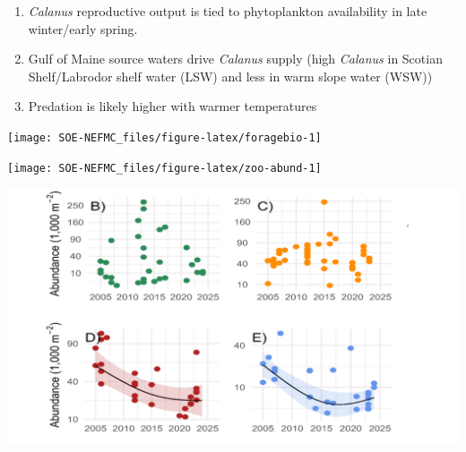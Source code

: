 \documentclass[
  10pt,
]{article}
\providecommand{\tightlist}{%
  \setlength{\itemsep}{0pt}\setlength{\parskip}{0pt}}
\let\origfigure\figure
\let\endorigfigure\endfigure
\renewenvironment{figure}[1][2] {
    \expandafter\origfigure\expandafter[H]
} {
    \endorigfigure
}
\begin{document}
\begin{enumerate}
\def\labelenumi{\arabic{enumi}.}
\tightlist
\item
  \emph{Calanus} reproductive output is tied to phytoplankton availability in late winter/early spring.
\item
  Gulf of Maine source waters drive \emph{Calanus} supply (high \emph{Calanus} in Scotian Shelf/Labrodor shelf water (LSW) and less in warm slope water (WSW))
\item
  Predation is likely higher with warmer temperatures
\end{enumerate}

\begin{figure}

{\centering \texttt{[image: SOE-NEFMC\_files/figure-latex/foragebio-1]} 

}

\caption{Forage fish index in GB (left) and GOM (right) for spring (blue) and fall (red) surveys. Index values are relative to the maximum observation within a region across surveys.}\label{fig:foragebio}
\end{figure}
\begin{figure}

{\centering \texttt{[image: SOE-NEFMC\_files/figure-latex/zoo-abund-1]} 

}

\caption{Georges Bank (GB) and Gulf of Maine (GOM) abundance anomalies three dominant zooplankton (\textit{Calanus finmarchicus}, \textit{Calanus typicus}, and \textit{Pseudocalanus spp}.).}\label{fig:zoo-abund}
\end{figure}
\begin{figure}

{\centering \includegraphics[width=24.42in]{SOE-NEFMC_files/figure-latex/zooplankton-season-1} 

}

\caption{Abundance (no $m^-2$) of *C. finmarchicus C3-C6 estimated from 200$\mu$ vertical ring net tows. Individual data with fitted lines.Data from 2005-2010: circles; 2011-2021:triangles; 2022-2024:squares) WBTS station seasonal abundance time series for B) spring, C) summer, D) fall, E)winter. Vertical lines denote season boudnaries. If the seasonal abundance time series is significant, GAM predictions are calculated with day of year set to 1, 100, 200, and 300 for winter, spring, summer, and fall, respectively.}\label{fig:zooplankton-season}
\end{figure}
\end{document}
